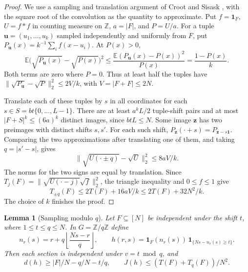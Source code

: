 \documentclass[11pt,reqno]{amsart}
\newtheorem{lemma}[theorem]{Lemma}
\newcommand{\Z}{\mathbb Z}
\newcommand{\E}{\mathbb E}
\newcommand{\ind}{\mathbf 1}
\numberwithin{equation}{section}
\begin{document}
\begin{proof}
We use a sampling and translation argument of Croot and Sisask
\cite{croot-sisask}, with the square root of the convolution as the
quantity to approximate. Put \(f=\ind_F\), \(U=f*f\) in counting
measure on \(\Z\), \(a=|F|\), and \(P=U/a\). For a tuple
\(\mathbf u=(u_1,\dots,u_k)\) sampled independently and uniformly
from \(F\), put \(P_{\mathbf u}(x)=k^{-1}\sum_i f(x-u_i)\).
At \(P(x)>0\),
\[
 \E\big(\sqrt{P_{\mathbf u}(x)}-\sqrt{P(x)}\big)^2
 \le \frac{\E(P_{\mathbf u}(x)-P(x))^2}{P(x)}
 =\frac{1-P(x)}{k}.
\]
Both terms are zero where \(P=0\). Thus at least half the tuples have
\(\|\sqrt{P_{\mathbf u}}-\sqrt P\|_2^2\le 2V/k\), with
\(V=|F+F|\le2N\).

Translate each of these tuples by \(s\) in all coordinates for
each \(s\in S=bt\{0,\dots,L-1\}\). There are at least \(a^kL/2\)
tuple-shift pairs and at most \(|F+S|^k\le(6a)^k\) distinct
images, since \(btL\le N\). Some image \(\mathbf z\) has two
preimages with distinct shifts \(s,s'\). For each such shift,
\(P_{\mathbf z}(\cdot+s)=P_{\mathbf z-s\mathbf 1}\).
Comparing the two approximations after translating one of them,
and taking \(q=|s'-s|\), gives
\[
 \|\sqrt{U(\cdot\pm q)}-\sqrt U\|_2^2\le 8aV/k.
\]
The norms for the two signs are equal by translation. Since
\(T_j(F)=\|\sqrt{U(\cdot-j)}\sqrt f\|_2^2\), the triangle
inequality and \(0\le f\le1\) give
\[
 T_{\pm q}(F)\le 2T(F)+16aV/k
              \le 2T(F)+32N^2/k.
\]
The choice of \(k\) finishes the proof.
\end{proof}

\begin{samepage}
\begin{lemma}[Sampling modulo \(q\)]\label{lem:sampler}
Let \(F\subseteq[N]\) be independent under the shift \(t\), where
\(1\le t\le q\le N\). In \(G=\Z/q\Z\) define
\[
 n_r(s)=r+q\left\lfloor\frac{Ns-r}{q}\right\rfloor,\qquad
 h(r,s)=\ind_F(n_r(s))\,\ind_{\{Ns-n_r(s)\ge t\}}.
\]
Then each section is independent under \(v=t\bmod q\), and
\begin{equation}\label{eq:sampler}
 d(h)\ge |F|/N-q/N-t/q,\qquad J(h)\le (T(F)+T_q(F))/N^2.
\end{equation}
\end{lemma}
\end{samepage}
\end{document}
